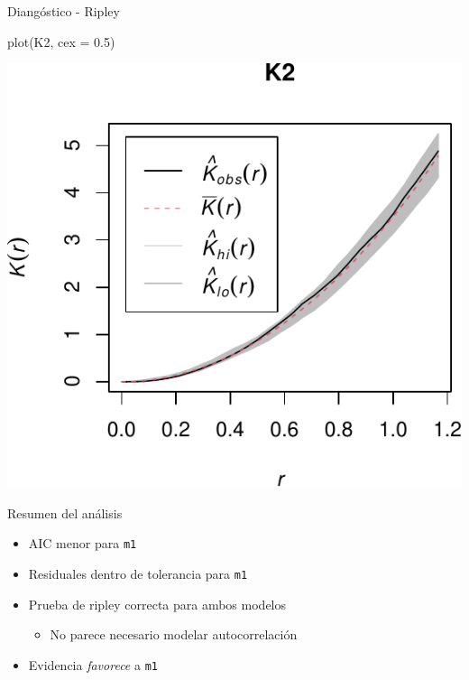 \documentclass[
  11pt,
  ignorenonframetext,
]{beamer}
\newenvironment{Shaded}{}{}
\newcommand{\AttributeTok}[1]{\textcolor[rgb]{0.49,0.56,0.16}{#1}}
\newcommand{\FloatTok}[1]{\textcolor[rgb]{0.25,0.63,0.44}{#1}}
\newcommand{\FunctionTok}[1]{\textcolor[rgb]{0.02,0.16,0.49}{#1}}
\newcommand{\NormalTok}[1]{#1}
\providecommand{\tightlist}{%
  \setlength{\itemsep}{0pt}\setlength{\parskip}{0pt}}
\begin{document}
\begin{frame}[fragile]{Diangóstico - Ripley}
\protect\hypertarget{dianguxf3stico---ripley}{}
\begin{Shaded}
\begin{Highlighting}[]
\FunctionTok{plot}\NormalTok{(K2, }\AttributeTok{cex =} \FloatTok{0.5}\NormalTok{)}
\end{Highlighting}
\end{Shaded}

\begin{center}\includegraphics{Tutorial-spatstat-2_files/figure-beamer/unnamed-chunk-21-1} \end{center}
\end{frame}

\begin{frame}[fragile]{Resumen del análisis}
\protect\hypertarget{resumen-del-anuxe1lisis}{}
\begin{itemize}
\item
  AIC menor para \texttt{m1}
\item
  Residuales dentro de tolerancia para \texttt{m1}
\item
  Prueba de ripley correcta para ambos modelos

  \begin{itemize}
  \tightlist
  \item
    No parece necesario modelar autocorrelación
  \end{itemize}
\item
  Evidencia \emph{favorece} a \texttt{m1}
\end{itemize}
\end{frame}
\end{document}
